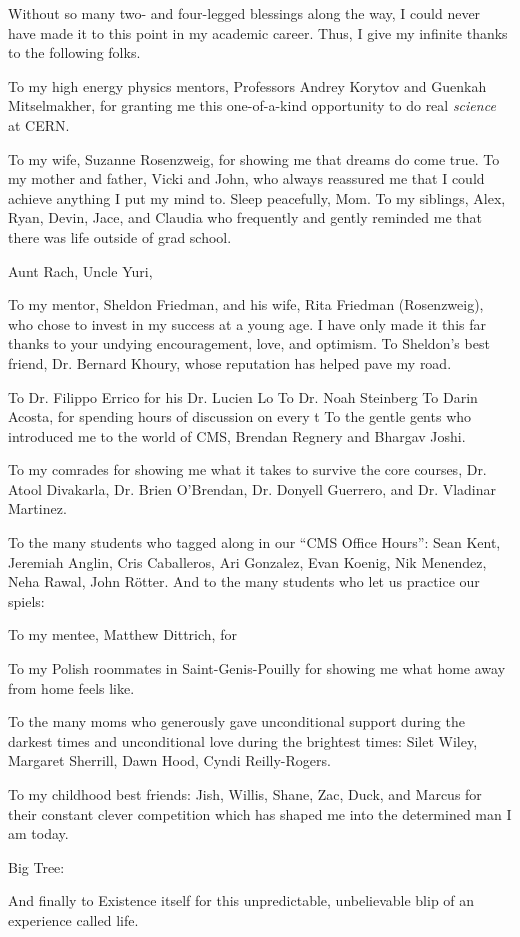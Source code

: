 Without so many two- and four-legged blessings along the way, I could never have made it to this point in my academic career.
Thus, I give my infinite thanks to the following folks.

To my high energy physics mentors, Professors Andrey Korytov and Guenkah Mitselmakher, for granting me this one-of-a-kind opportunity to do real \emph{science} at CERN.

To my wife, Suzanne Rosenzweig, for showing me that dreams do come true.
To my mother and father, Vicki and John, who always reassured me that I could achieve anything I put my mind to. Sleep peacefully, Mom.
To my siblings, Alex, Ryan, Devin, Jace, and Claudia who frequently and gently reminded me that there was life outside of grad school.

Aunt Rach, Uncle Yuri,

To my mentor, Sheldon Friedman, and his wife, Rita Friedman (Rosenzweig), who chose to invest in my success at a young age.
I have only made it this far thanks to your undying encouragement, love, and optimism.
To Sheldon's best friend, Dr. Bernard Khoury, whose reputation has helped pave my road.

To Dr. Filippo Errico for his 
Dr. Lucien Lo
To Dr. Noah Steinberg
To Darin Acosta, for spending hours of discussion on every t
To the gentle gents who introduced me to the world of CMS, Brendan Regnery and Bhargav Joshi.

To my comrades for showing me what it takes to survive the core courses,
Dr. Atool Divakarla, Dr. Brien O'Brendan, Dr. Donyell Guerrero, and Dr. Vladinar Martinez.

To the many students who tagged along in our ``CMS Office Hours'':
Sean Kent, Jeremiah Anglin, Cris Caballeros, Ari Gonzalez, 
Evan Koenig, Nik Menendez, Neha Rawal, John Rötter.
And to the many students who let us practice our spiels:


To my mentee, Matthew Dittrich, for 

To my Polish roommates in Saint-Genis-Pouilly for showing me what home away from home feels like.

To the many moms who generously gave unconditional support during the darkest times and unconditional love during the brightest times:
Silet Wiley, Margaret Sherrill, Dawn Hood, Cyndi Reilly-Rogers.

To my childhood best friends:
Jish, Willis, Shane, Zac, Duck, and Marcus for their constant clever competition which has shaped me into the determined man I am today.

Big Tree:

And finally to Existence itself for this unpredictable, unbelievable blip of an experience called life.
